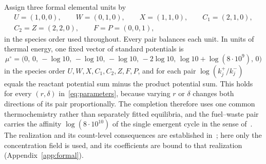 \documentclass[11pt,a4paper]{article}
\theoremstyle{plain}
\theoremstyle{definition}
\theoremstyle{remark}
\begin{document}
Assign three formal elemental units by
\[
\begin{gathered}
U=(1,0,0),\qquad W=(0,1,0),\qquad X=(1,1,0),\qquad C_1=(2,1,0),\\
C_2=Z=(2,2,0),\qquad F=P=(0,0,1),
\end{gathered}
\]
in the species order used throughout.
Every pair balances each unit. In units of thermal energy, one fixed vector of standard potentials is
\begin{equation}\label{eq:potential}
\mu^\circ=\bigl(0,\,0,\,-\log10,\,-\log10,\,-\log10,\,-2\log10,\,\log10+\log(8\cdot10^9),\,0\bigr)
\end{equation}
in the species order $U,W,X,C_1,C_2,Z,F,P$, and for each pair $\log(k_j^+/k_j^-)$ equals the reactant potential sum minus the product potential sum. This holds for every $(r,\delta)$ in~\eqref{eq:parameters}, because varying $r$ or $\delta$ changes both directions of its pair proportionally. The completion therefore uses one common thermochemistry rather than separately fitted equilibria, and the fuel--waste pair carries the affinity $\log(8\cdot10^{10})$ of the single emergent cycle in the sense of~\citep{polettini2014}. The realization and its count-level consequences are established in~\citep{thermo2026}; here only the concentration field is used, and its coefficients are bound to that realization (Appendix~\ref{app:formal}).
\end{document}
